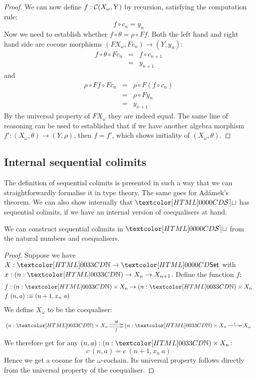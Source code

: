 \begin{proof}
  We can now define $f : \mathcal{C}(X_\omega, Y)$ by recursion, satisfying
  the computation rule:
  $$
  f \circ c_n = y_n
  $$
  Now we need to establish whether $f \circ \theta = \rho \circ F
  f$.
  Both the left hand and right hand side are cocone morphisms
  $(F X_\omega , F c_n) \to (Y , y_n)$:
  \begin{align*}
    f \circ \theta \circ F c_n &=& f \circ c_{n+1} \\
    &=&y_{n+1}
  \end{align*}
  and
  \begin{align*}
    \rho \circ F f \circ F c_n &=& \rho \circ F (f \circ c_n) \\
    &=&\rho \circ F y_n \\
    &=&y_{n+1}
  \end{align*}
  By the universal property of $F X_\omega$ they are indeed equal. The
  same line of reasoning can be used to established that if we have
  another algebra morphism $f' : (X_\omega,\theta) \to (Y,\rho)$, then
  $f = f'$, which shows initiality of $(X_\omega,\theta)$.
\end{proof}

\subsection{Internal sequential colimits}

The definition of sequential colimits is presented in such a way that
we can straightforwardly formalise it in type theory. The same goes
for Ad\'amek's theorem. We can also show internally that $\SET$ has
sequential colimits, if we have an internal version of coequalisers at
hand.

\begin{proposition}
  We can construct sequential colimits in $\SET$ from the natural
  numbers and coequalisers.
\end{proposition}

\begin{proof}
  Suppose we have $X : \natty \to \Set$ with
  $x : (n : \natty) \to X_n \to X_{n+1}$. Define the function $f$:
  \begin{align*}
    &f : (n : \natty) \times X_n \to (n : \natty) \times X_n \\
    &f\ (n , a) \ddefeq (n + 1 , x_n\ a)
  \end{align*}
  We define $X_\omega$ to be the coequaliser:
  $$
  \xymatrix{
    (n : \natty) \times X_n
    \ar@<.5ex>[r]^{\id}
    \ar@<-.5ex>[r]_{f}
    &(n : \natty) \times X_n
    \ar[r]^-{c}
    &X_\omega
  }
  $$
  We therefore get for any $(n , a) : (n : \natty) \times X_n$:
  $$
  c\ (n , a) = c\ (n + 1 , x_n\ a)
  $$
  Hence we get a cocone for the $\omega$-cochain. Its universal
  property follows directly from the universal property of the
  coequaliser.
\end{proof}


